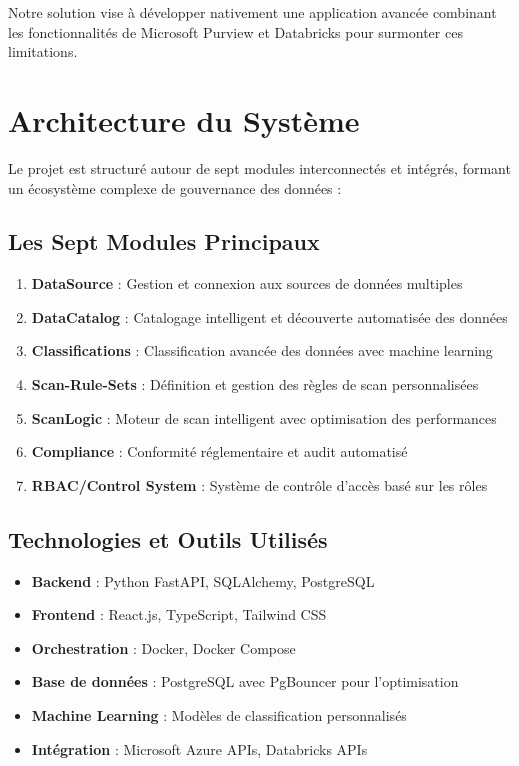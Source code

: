 \documentclass[12pt,a4paper]{article}
\begin{document}
Notre solution vise à développer nativement une application avancée combinant les fonctionnalités de Microsoft Purview et Databricks pour surmonter ces limitations.

\section{Architecture du Système}

Le projet est structuré autour de sept modules interconnectés et intégrés, formant un écosystème complexe de gouvernance des données :

\subsection{Les Sept Modules Principaux}

\begin{enumerate}
    \item \textbf{DataSource} : Gestion et connexion aux sources de données multiples
    \item \textbf{DataCatalog} : Catalogage intelligent et découverte automatisée des données
    \item \textbf{Classifications} : Classification avancée des données avec machine learning
    \item \textbf{Scan-Rule-Sets} : Définition et gestion des règles de scan personnalisées
    \item \textbf{ScanLogic} : Moteur de scan intelligent avec optimisation des performances
    \item \textbf{Compliance} : Conformité réglementaire et audit automatisé
    \item \textbf{RBAC/Control System} : Système de contrôle d'accès basé sur les rôles
\end{enumerate}

\subsection{Technologies et Outils Utilisés}

\begin{itemize}
    \item \textbf{Backend} : Python FastAPI, SQLAlchemy, PostgreSQL
    \item \textbf{Frontend} : React.js, TypeScript, Tailwind CSS
    \item \textbf{Orchestration} : Docker, Docker Compose
    \item \textbf{Base de données} : PostgreSQL avec PgBouncer pour l'optimisation
    \item \textbf{Machine Learning} : Modèles de classification personnalisés
    \item \textbf{Intégration} : Microsoft Azure APIs, Databricks APIs
\end{itemize}
\end{document}
